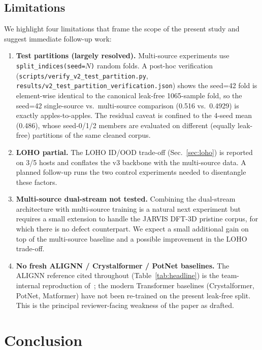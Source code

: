 \documentclass[11pt,a4paper]{article}
\begin{document}
\subsection{Limitations}
We highlight four limitations that frame the scope of the present
study and suggest immediate follow-up work:

\begin{enumerate}[leftmargin=20pt, itemsep=2pt]
\item \textbf{Test partitions (largely resolved).} Multi-source
experiments use \texttt{split\_indices(seed=$N$)} random folds. A
post-hoc verification
(\texttt{scripts/verify\_v2\_test\_partition.py},
\texttt{results/v2\_test\_partition\_verification.json}) shows the
seed=42 fold is element-wise identical to the canonical leak-free
1065-sample fold, so the seed=42 single-source vs.\ multi-source
comparison (0.516 vs.\ 0.4929) is exactly apples-to-apples. The
residual caveat is confined to the 4-seed mean (0.486), whose
seed-0/1/2 members are evaluated on different (equally leak-free)
partitions of the same cleaned corpus.

\item \textbf{LOHO partial.} The LOHO ID/OOD trade-off
(Sec.~\ref{sec:loho}) is reported on 3/5 hosts and conflates the v3
backbone with the multi-source data. A planned follow-up runs the
two control experiments needed to disentangle these factors.

\item \textbf{Multi-source dual-stream not tested.} Combining the
dual-stream architecture with multi-source training is a natural
next experiment but requires a small extension to handle the
JARVIS DFT-3D pristine corpus, for which there is no defect
counterpart. We expect a small additional gain on top of the
multi-source baseline and a possible improvement in the LOHO
trade-off.

\item \textbf{No fresh ALIGNN / Crystalformer / PotNet baselines.}
The ALIGNN reference cited throughout
(Table~\ref{tab:headline}) is the team-internal reproduction
of~\cite{ourPaperV12}; the modern Transformer baselines
(Crystalformer, PotNet, Matformer) have not been re-trained on the
present leak-free split. This is the principal reviewer-facing
weakness of the paper as drafted.
\end{enumerate}

\section{Conclusion}\label{sec:conclusion}
\end{document}
